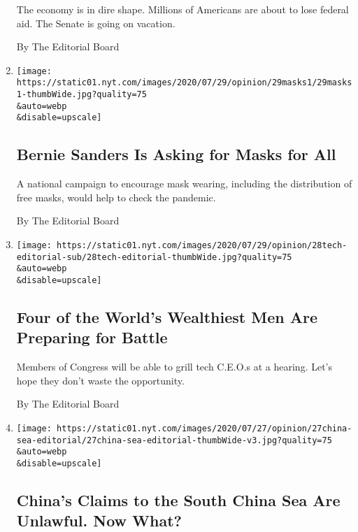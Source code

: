 \begin{enumerate}
  The economy is in dire shape. Millions of Americans are about to lose
  federal aid. The Senate is going on vacation.

  By The Editorial Board
\item
  \href{/2020/07/29/opinion/us-coronavirus-masks.html}{}

  \texttt{[image: https://static01.nyt.com/images/2020/07/29/opinion/29masks1/29masks1-thumbWide.jpg?quality=75\\\&auto=webp\\\&disable=upscale]}

  \hypertarget{bernie-sanders-is-asking-for-masks-for-all}{%
  \subsection{Bernie Sanders Is Asking for Masks for
  All}\label{bernie-sanders-is-asking-for-masks-for-all}}

  A national campaign to encourage mask wearing, including the
  distribution of free masks, would help to check the pandemic.

  By The Editorial Board
\item
  \href{/2020/07/28/opinion/tech-ceo-hearing-congress.html}{}

  \texttt{[image: https://static01.nyt.com/images/2020/07/29/opinion/28tech-editorial-sub/28tech-editorial-thumbWide.jpg?quality=75\\\&auto=webp\\\&disable=upscale]}

  \hypertarget{four-of-the-worlds-wealthiest-men-are-preparing-for-battle}{%
  \subsection{Four of the World's Wealthiest Men Are Preparing for
  Battle}\label{four-of-the-worlds-wealthiest-men-are-preparing-for-battle}}

  Members of Congress will be able to grill tech C.E.O.s at a hearing.
  Let's hope they don't waste the opportunity.

  By The Editorial Board
\item
  \href{/2020/07/27/opinion/pompeo-south-china-sea.html}{}

  \texttt{[image: https://static01.nyt.com/images/2020/07/27/opinion/27china-sea-editorial/27china-sea-editorial-thumbWide-v3.jpg?quality=75\\\&auto=webp\\\&disable=upscale]}

  \hypertarget{chinas-claims-to-the-south-china-sea-are-unlawful-now-what}{%
  \subsection{China's Claims to the South China Sea Are Unlawful. Now
  What?}\label{chinas-claims-to-the-south-china-sea-are-unlawful-now-what}}


\end{enumerate}
